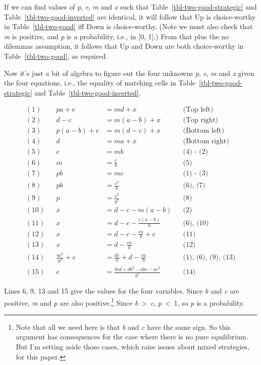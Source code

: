 \documentclass[
  10pt,
  letterpaper,
  DIV=11,
  numbers=noendperiod,
  twoside]{scrartcl}
\begin{document}
If we can find values of \emph{p}, \emph{e}, \emph{m} and \emph{x} such
that Table~\ref{tbl-two-good-strategic} and
Table~\ref{tbl-two-good-inverted} are identical, it will follow that Up
is choice-worthy in Table~\ref{tbl-two-good} iff Down is choice-worthy.
(Note we must also check that \emph{m} is positive, and \emph{p} is a
probability, i.e., in {[}0, 1{]}.) From that plus the no dilemmas
assumption, it follows that Up and Down are both choice-worthy in
Table~\ref{tbl-two-good}, as required.

Now it's just a bit of algebra to figure out the four unknowns \emph{p},
\emph{e}, \emph{m} and \emph{x} given the four equations, i.e., the
equality of matching cells in Table~\ref{tbl-two-good-strategic} and
Table~\ref{tbl-two-good-inverted}.

\begin{align*}
(1) && pa + e &= md + x && \text{(Top left)} \\
(2) && d - c &= m(a - b) + x && \text{(Top right)} \\
(3) && p(a - b) + e &= m(d - c) + x && \text{(Bottom left)} \\
(4) && d &= ma + x && \text{(Bottom right)} \\
(5) && c &= mb && \text{(4) - (2)} \\
(6) && m &= \frac{c}{b} && \text{(5)} \\
(7) && pb &= mc && \text{(1) - (3)} \\
(8) && pb &= \frac{c^2}{b} && \text{(6), (7)} \\
(9) && p &= \frac{c^2}{b^2} && \text{(8)} \\
(10) && x &= d - c - m(a - b) && \text{(2)} \\
(11) && x &= d - c - \frac{c(a - b)}{b} && \text{(6), (10)} \\
(12) && x &= d - c - \frac{ca}{b} + c && \text{(11)} \\
(13) && x &= d - \frac{ca}{b} && \text{(12)} \\
(14) && \frac{ac^2}{b^2} + e &= \frac{dc}{b} + d - \frac{ca}{b} && \text{(1), (6), (9), (13)} \\
(15) && e &= \frac{bcd + db^2 - abc - ac^2}{b^2} && \text{(14)}
\end{align*}

Lines 6, 9, 13 and 15 give the values for the four variables. Since
\emph{b} and \emph{c} are positive, \emph{m} and \emph{p} are also
positive.\footnote{Note that all we need here is that \emph{b} and
  \emph{c} have the same sign. So this argument has consequences for the
  case where there is no pure equilibrium. But I'm setting aside those
  cases, which raise issues about mixed strategies, for this paper.}
Since \emph{b}~\textgreater~\emph{c}, \emph{p}~\textless~1, so \emph{p}
is a probability.
\end{document}
